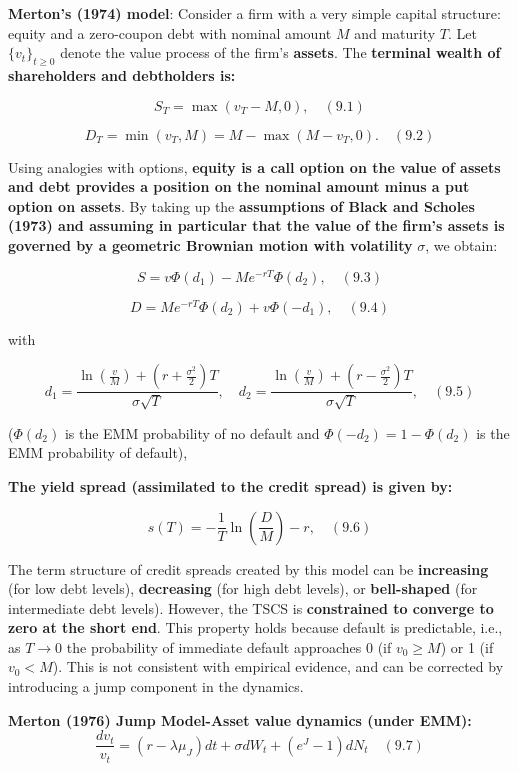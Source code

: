 \documentclass[12pt,a4paper]{article}
\begin{document}
\textbf{Merton's (1974) model}: Consider a firm with a very simple capital structure: equity and a zero-coupon debt with nominal amount $M$ and maturity $T$. Let $\{v_t\}_{t \geq 0}$ denote the value process of the firm's \textbf{assets}. The \textbf{terminal wealth of shareholders and debtholders is:}

$$S_T = \max(v_T - M, 0), \quad (9.1)$$

$$D_T = \min(v_T, M) = M - \max(M - v_T, 0). \quad (9.2)$$

Using analogies with options, \textbf{equity is a call option on the value of assets and debt provides a position on the nominal amount minus a put option on assets}. By taking up the \textbf{assumptions of Black and Scholes (1973) and assuming in particular that the value of the firm's assets is governed by a geometric Brownian motion with volatility} $\sigma$, we obtain:

$$S = v\Phi(d_1) - Me^{-rT}\Phi(d_2), \quad (9.3)$$

$$D = Me^{-rT}\Phi(d_2) + v\Phi(-d_1), \quad (9.4)$$


with

$$d_1 = \frac{\ln\left(\frac{v}{M}\right) + \left(r + \frac{\sigma^2}{2}\right)T}{\sigma\sqrt{T}}, \quad d_2 = \frac{\ln\left(\frac{v}{M}\right) + \left(r - \frac{\sigma^2}{2}\right)T}{\sigma\sqrt{T}}, \quad (9.5)$$

($\Phi(d_2)$ is the EMM probability of no default and $\Phi(-d_2) = 1 - \Phi(d_2)$ is the EMM probability of default),

\textbf{The yield spread (assimilated to the credit spread) is given by:}

$$s(T) = -\frac{1}{T}\ln\left(\frac{D}{M}\right) - r, \quad (9.6)$$

The term structure of credit spreads created by this model can be \textbf{increasing} (for low debt levels), \textbf{decreasing} (for high debt levels), or \textbf{bell-shaped} (for intermediate debt levels). However, the TSCS is \textbf{constrained to converge to zero at the short end}. This property holds because default is predictable, i.e., as $T \to 0$ the probability of immediate default approaches 0 (if $v_0 \geq M$) or 1 (if $v_0 < M$). This is not consistent with empirical evidence, and can be corrected by introducing a jump component in the dynamics.

\textbf{Merton (1976) Jump Model-Asset value dynamics (under EMM):}
$$\frac{dv_t}{v_t} = (r - \lambda\mu_J)dt + \sigma dW_t + (e^J - 1)dN_t \quad (9.7)$$
\end{document}

